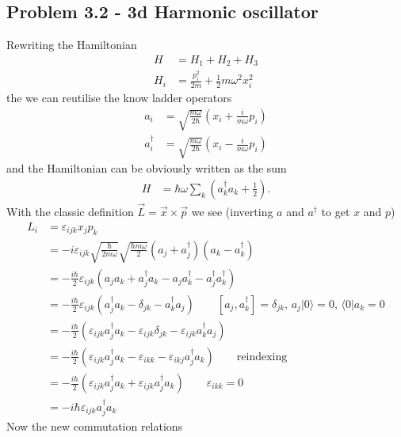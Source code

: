 \documentclass[10pt,a4paper]{book}
\theoremstyle{definition}
\begin{document}
\subsection{Problem 3.2 - 3d Harmonic oscillator}
Rewriting the Hamiltonian
\begin{align}
H&=H_1+H_2+H_3\\
H_i&=\frac{p_i^2}{2m}+\frac{1}{2}m\omega^2 x_i^2
\end{align}
the we can reutilise the know ladder operators
\begin{align}
a_i&=\sqrt{\frac{m\omega}{2\hbar}}\left(x_i+\frac{i}{m\omega}p_i\right)\\
a_i^\dagger&=\sqrt{\frac{m\omega}{2\hbar}}\left(x_i-\frac{i}{m\omega}p_i\right)
\end{align}
and the Hamiltonian can be obviously written as the sum
\begin{align}
H&=\hbar\omega\sum_k\left(a_k^\dagger a_k+\frac{1}{2}\right).
\end{align}
With the classic definition $\vec{L}=\vec{x}\times\vec{p}$ we see (inverting $a$ and $a^\dagger$ to get $x$ and $p$)
\begin{align}
L_i&=\varepsilon_{ijk} x_j p_k\\
&=-i\varepsilon_{ijk}\sqrt{\frac{\hbar}{2m\omega}}\sqrt{\frac{\hbar m\omega}{2}}(a_j+a_j^\dagger)(a_k-a_k^\dagger)\\
&=-\frac{i\hbar}{2}\varepsilon_{ijk}(a_ja_k+a_j^\dagger a_k -a_ja_k^\dagger-a_j^\dagger a_k^\dagger)\\
&=-\frac{i\hbar}{2}\varepsilon_{ijk}(a_j^\dagger a_k -\delta_{jk}-a_k^\dagger a_j)\qquad[a_j,a_k^\dagger]=\delta_{jk},\,a_j|0\rangle=0,\,\langle0|a_k=0\\
&=-\frac{i\hbar}{2}(\varepsilon_{ijk}a_j^\dagger a_k -\varepsilon_{ijk}\delta_{jk}-\varepsilon_{ijk}a_k^\dagger a_j)\\
&=-\frac{i\hbar}{2}(\varepsilon_{ijk}a_j^\dagger a_k -\varepsilon_{ikk}-\varepsilon_{ikj}a_j^\dagger a_k)\qquad\text{reindexing}\\
&=-\frac{i\hbar}{2}(\varepsilon_{ijk}a_j^\dagger a_k +\varepsilon_{ijk}a_j^\dagger a_k)\qquad\varepsilon_{ikk}=0\\
&=-i\hbar\varepsilon_{ijk}a_j^\dagger a_k
\end{align}
Now the new commutation relations
\end{document}
